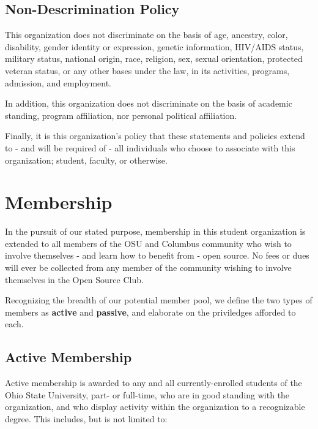\documentclass[12pt,letterpaper]{article}
\begin{document}
\subsection{Non-Descrimination Policy}

This organization does not discriminate on the basis of age, ancestry, color, disability,
gender identity or expression, genetic information, HIV/AIDS status, military status,
national origin, race, religion, sex, sexual orientation, protected veteran status, or
any other bases under the law, in its activities, programs, admission, and employment.

In addition, this organization does not discriminate on the basis of academic standing,
program affiliation, nor personal political affiliation.

Finally, it is this organization's policy that these statements and policies extend to
- and will be required of - all individuals who choose to associate with this
organization; student, faculty, or otherwise.

\section{Membership}

In the pursuit of our stated purpose, membership in this student organization is extended
to all members of the OSU and Columbus community who wish to involve themselves - and
learn how to benefit from - open source. No fees or dues will ever be collected from any
member of the community wishing to involve themselves in the Open Source Club.

Recognizing the breadth of our potential member pool, we define the two types of
members as \textbf{active} and \textbf{passive}, and elaborate on the priviledges afforded
to each.

\subsection{Active Membership}

Active membership is awarded to any and all currently-enrolled students of the Ohio State
University, part- or full-time, who are in good standing with the organization, and who
display activity within the organization to a recognizable degree. This includes, but is
not limited to:
\end{document}

